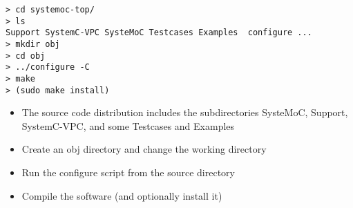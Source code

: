 \begin{frame}[fragile=singleslide]
\begin{lstlisting}
> cd systemoc-top/
> ls
Support SystemC-VPC SysteMoC Testcases Examples  configure ...
> mkdir obj
> cd obj
> ../configure -C
> make
> (sudo make install)
\end{lstlisting}
\begin{itemize}
\item The source code distribution includes the subdirectories SysteMoC, Support, SystemC-VPC, and some Testcases and Examples
\item Create an obj directory and change the working directory
\item Run the configure script from the source directory
\item Compile the software (and optionally install it)
\end{itemize}
\end{frame}

